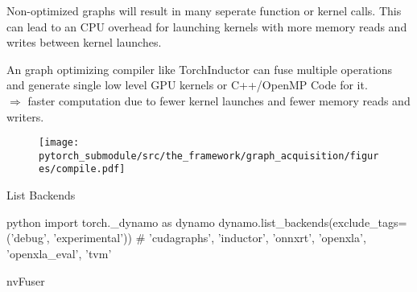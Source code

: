 \begin{sectionbox}\nospacing
    Non-optimized graphs will result in many seperate function or kernel calls.
    This can lead to an CPU overhead for launching kernels with more memory reads and writes between kernel launches.

    An graph optimizing compiler like TorchInductor can fuse multiple operations and generate single low level GPU kernels or C++/OpenMP Code for it.\\
    $\Rightarrow$ faster computation due to fewer kernel launches and fewer memory reads and writers.
    \begin{figure}[H]
        \centering
        \texttt{[image: pytorch\_submodule/src/the\_framework/graph\_acquisition/figures/compile.pdf]}
    \end{figure}
\end{sectionbox}
\begin{methodbox}{List Backends}
    \begin{plaincodebox}{python}
    import torch._dynamo as dynamo
    dynamo.list_backends(exclude_tags=('debug', 'experimental'))
    # 'cudagraphs', 'inductor', 'onnxrt', 'openxla', 'openxla_eval', 'tvm'
    \end{plaincodebox}
\end{methodbox}
\begin{notebox}\nospacing
        \begin{itemizenosep}
            \item nvFuser
        \end{itemizenosep}
\end{notebox}
